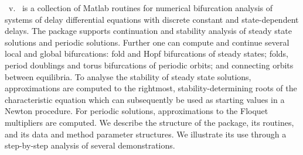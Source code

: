 {\DDEBIFCODE\ v.~\version} is a collection of Matlab routines for
numerical bifurcation analysis of systems of delay differential
equations with discrete constant and state-dependent delays.
%
The package supports continuation and stability analysis of steady
state solutions and periodic solutions.  Further one can compute and
continue several local and global bifurcations: fold and Hopf
bifurcations of steady states; folds, period doublings and torus
bifurcations of periodic orbits; and
connecting orbits between equilibria.
%
To analyse the stability of steady state solutions, approximations are
computed to the rightmost, stability-determining roots of the
characteristic equation which can sub\-sequently be used as starting
values in a Newton procedure.
%
For periodic solutions, approximations to the Floquet multipliers are
computed.  We describe the structure of the package, its routines, and
its data and method parameter structures.  We illustrate its use
through a step-by-step analysis of several demonstrations.
 
